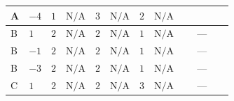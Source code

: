 \documentclass[8pt]{article}
\begin{document}
\begin{landscape}
\begin{longtable}{@{}llcccccc >{\raggedright\arraybackslash}p{0.21\linewidth} >{\raggedright\arraybackslash}p{0.21\linewidth} >{\raggedright\arraybackslash}p{0.21\linewidth}@{}}
\midrule
A & $-4$ & $1$ & $\text{N/A}$ & $3$ & $\text{N/A}$ & $2$ & $\text{N/A}$ & \scriptsize\adjustbox{max width=\linewidth}{$\begin{gathered} -24 {g_2}^2 {\lambda_{S_2}^{(1)}}\end{gathered}$} & \scriptsize\adjustbox{max width=\linewidth}{$\begin{gathered} +12 {g_1}^4\end{gathered}$} & \scriptsize\adjustbox{max width=\linewidth}{$\begin{gathered} +2 {\lambda_{12}^{(1)}}^2\end{gathered}$} \\
\midrule
B & $1$ & $2$ & $\text{N/A}$ & $2$ & $\text{N/A}$ & $1$ & $\text{N/A}$ & \scriptsize\adjustbox{max width=\linewidth}{$\begin{gathered} -9 {g_2}^2 {\lambda_{S_2}^{(1)}}\end{gathered}$} & --- & \scriptsize\adjustbox{max width=\linewidth}{$\begin{gathered} +4 {\lambda_{12}^{(1)}}^2\end{gathered}$} \\
\midrule
B & $-1$ & $2$ & $\text{N/A}$ & $2$ & $\text{N/A}$ & $1$ & $\text{N/A}$ & \scriptsize\adjustbox{max width=\linewidth}{$\begin{gathered} -9 {g_2}^2 {\lambda_{S_2}^{(1)}}\end{gathered}$} & --- & \scriptsize\adjustbox{max width=\linewidth}{$\begin{gathered} +4 {\lambda_{12}^{(1)}}^2\end{gathered}$} \\
\midrule
B & $-3$ & $2$ & $\text{N/A}$ & $2$ & $\text{N/A}$ & $1$ & $\text{N/A}$ & \scriptsize\adjustbox{max width=\linewidth}{$\begin{gathered} -9 {g_2}^2 {\lambda_{S_2}^{(1)}}\end{gathered}$} & --- & \scriptsize\adjustbox{max width=\linewidth}{$\begin{gathered} +4 {\lambda_{12}^{(1)}}^2\end{gathered}$} \\
\midrule
C & $1$ & $2$ & $\text{N/A}$ & $2$ & $\text{N/A}$ & $3$ & $\text{N/A}$ & \scriptsize\adjustbox{max width=\linewidth}{$\begin{gathered} -9 {g_2}^2 {\lambda_{S_2}^{(1)}}\end{gathered}$} & --- & \scriptsize\adjustbox{max width=\linewidth}{$\begin{gathered} +4 {\lambda_{12}^{(1)}}^2\end{gathered}$} \\

\end{longtable}
\end{landscape}
\end{document}
